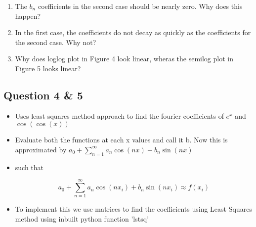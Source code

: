 \documentclass[a4paper]{article}
\providecommand{\tightlist}{%
      \setlength{\itemsep}{0pt}\setlength{\parskip}{0pt}}
\begin{document}
\begin{enumerate}
\def\labelenumi{(\alph{enumi})}
\tightlist
\item
  The \(b_{n}\) coefficients in the second case should be nearly zero.
  Why does this happen?
\item
  In the first case, the coefficients do not decay as quickly as the
  coefficients for the second case. Why not?
\item
  Why does loglog plot in Figure 4 look linear, wheras the semilog plot
  in Figure 5 looks linear?
\end{enumerate}

    \subsection{Question 4 \& 5}\label{question-4-5}

\begin{itemize}
\tightlist
\item
  Uses least squares method approach to find the fourier coefficients of
  \(e^{x}\) and \(\cos(\cos(x))\)
\item
  Evaluate both the functions at each x values and call it b. Now this
  is approximated by
  \(a_{0} + \sum\limits_{n=1}^{\infty} {{a_{n}\cos(nx)+b_{n}\sin(nx)}}\)
\item
  such that

  \begin{equation}
  a_{0} + \sum\limits_{n=1}^{\infty} {{a_{n}\cos(nx_{i})+b_{n}\sin(nx_{i})}} \approx f(x_{i}) 
  \end{equation}
\item
  To implement this we use matrices to find the coefficients using Least
  Squares method using inbuilt python function 'lstsq'
\end{itemize}
\end{document}
